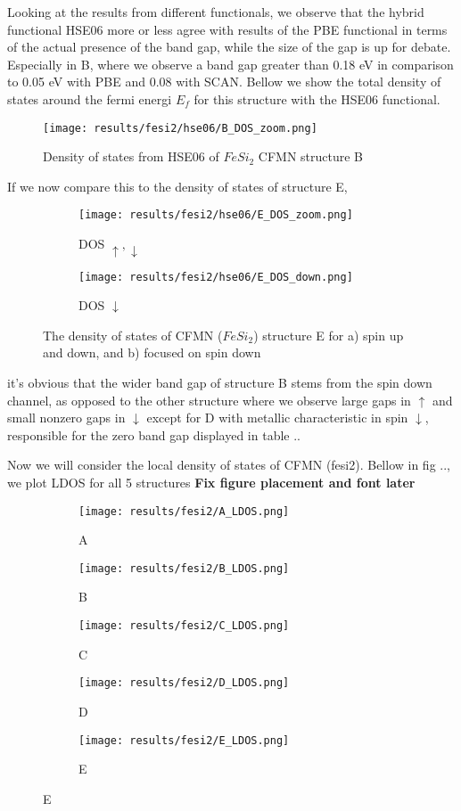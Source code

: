 Looking at the results from different functionals, we observe that the hybrid functional HSE06 more or less agree with results of the PBE functional in terms of the actual presence of the band gap, while the size of the gap is up for debate. Especially in B, where we observe a band gap greater than 0.18 eV in comparison to 0.05 eV with PBE and 0.08 with SCAN. Bellow we show the total density of states around the fermi energi $E_f$ for this structure with the HSE06 functional. 

\begin{figure}[H]
\centering
\texttt{[image: results/fesi2/hse06/B\_DOS\_zoom.png]}
\caption{Density of states from HSE06 of $FeSi_2$ CFMN structure B}
\label{DOS_hse06_B}
\end{figure}

If we now compare this to the density of states of structure E,

\begin{figure}[H]
\begin{subfigure}{0.5\textwidth}
\texttt{[image: results/fesi2/hse06/E\_DOS\_zoom.png]}
\caption{DOS $\uparrow, \downarrow$}
\end{subfigure}
\hfill
\begin{subfigure}{0.5\textwidth}
\texttt{[image: results/fesi2/hse06/E\_DOS\_down.png]}
\caption{DOS $\downarrow$}
\end{subfigure}
\caption{The density of states of CFMN ($FeSi_2$) structure E for a) spin up and down, and b) focused on spin down}
\end{figure}

it's obvious that the wider band gap of structure B stems from the spin down channel, as opposed to the other structure where we observe large gaps in $\uparrow$ and small nonzero gaps in $\downarrow$ except for D with metallic characteristic in spin $\downarrow$, responsible for the zero band gap displayed in table ..

Now we will consider the local density of states of CFMN (fesi2). Bellow in fig .., we plot LDOS for all 5 structures \textbf{Fix figure placement and font later}
\newpage
\begin{figure}[H]
\begin{subfigure}{\textwidth}
\texttt{[image: results/fesi2/A\_LDOS.png]}
\caption{A}
\end{subfigure}
\begin{subfigure}{\textwidth}
\texttt{[image: results/fesi2/B\_LDOS.png]}
\caption{B}
\end{subfigure}
\begin{subfigure}{\textwidth}
\texttt{[image: results/fesi2/C\_LDOS.png]}
\caption{C}
\end{subfigure}
\begin{subfigure}{\textwidth}
\texttt{[image: results/fesi2/D\_LDOS.png]}
\caption{D}
\end{subfigure}
\begin{subfigure}{\textwidth}
\texttt{[image: results/fesi2/E\_LDOS.png]}
\caption{E}
\end{subfigure}
\end{figure}

